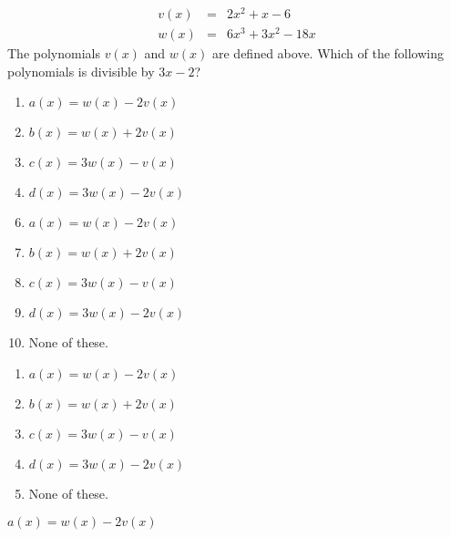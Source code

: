  \begin{eqnarray*}
v(x)&=&2x^2+x-6 \\
w(x)&=&6x^3+3x^2-18x
\end{eqnarray*}
The polynomials $v(x)$ and $w(x)$ are defined above.  Which of the following polynomials is divisible by $3x-2$?


\ifsat
	\begin{enumerate}[label=\Alph*)]
		\item $a(x)= w(x)-2v(x)$ %
		\item $b(x)= w(x)+2v(x)$
		\item $c(x)= 3w(x)-v(x)$ 
		\item $d(x)= 3w(x)-2v(x)$
	\end{enumerate}
\else
\fi

\ifacteven
	\begin{enumerate}[label=\textbf{\Alph*.},itemsep=\fill,align=left]
		\setcounter{enumii}{5}
		\item $a(x)= w(x)-2v(x)$ %
		\item $b(x)= w(x)+2v(x)$
		\item $c(x)= 3w(x)-v(x)$ 
		\addtocounter{enumii}{1}
		\item $d(x)= 3w(x)-2v(x)$
		\item None of these. 
	\end{enumerate}
\else
\fi

\ifactodd
	\begin{enumerate}[label=\textbf{\Alph*.},itemsep=\fill,align=left]
		\item $a(x)= w(x)-2v(x)$ %
		\item $b(x)= w(x)+2v(x)$
		\item $c(x)= 3w(x)-v(x)$ 
		\item $d(x)= 3w(x)-2v(x)$
		\item None of these. 
	\end{enumerate}
\else
\fi

\ifgridin
 $a(x)= w(x)-2v(x)$ %
		
\else
\fi

